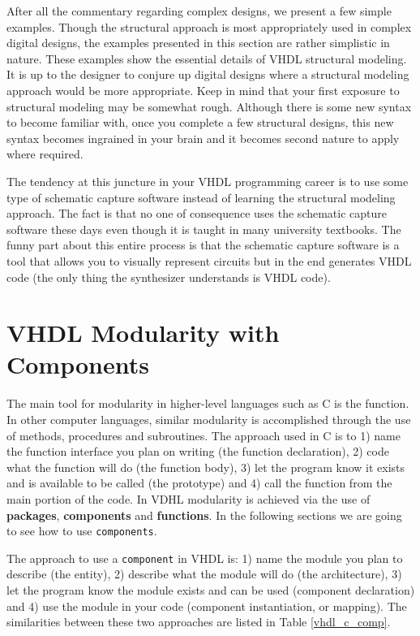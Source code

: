 After all the commentary regarding complex designs, we present a few simple examples. Though the structural approach is most appropriately used in complex digital designs, the examples presented in this section are rather simplistic in nature. These examples show the essential details of VHDL structural modeling. It is up to the designer to conjure up digital designs where a structural modeling approach would be more appropriate. Keep in mind that your first exposure to structural modeling may be somewhat rough. Although there is some new syntax to become familiar with, once you complete a few structural designs, this new syntax becomes ingrained in your brain and it becomes second nature to apply where required.

The tendency at this juncture in your VHDL programming career is to use some type of schematic capture software instead of learning the structural modeling approach. The fact is that no one of consequence uses the schematic capture software these days even though it is taught in many university textbooks. The funny part about this entire process is that the schematic capture software is a tool that allows you to visually represent circuits but in the end generates VHDL code (the only thing the synthesizer understands is VHDL code).

\section{VHDL Modularity with Components}
The main tool for modularity in higher-level languages such as C is the function. In other computer languages, similar modularity is accomplished through the use of methods, procedures and subroutines. The approach used in C is to 1) name the function interface you plan on writing (the function declaration), 2) code what the function will do (the function body), 3) let the program know it exists and is available to be called (the prototype) and 4) call the function from the main portion of the code. In VDHL modularity is achieved via the use of \textbf{packages}, \textbf{components} and \textbf{functions}. In the following sections we are going to see how to use \texttt{components}.

The approach to use a \texttt{component} in VHDL  is: 1) name the module you plan to describe (the entity), 2) describe what the module will do (the architecture), 3) let the program know the module exists and can be used (component declaration) and 4) use the module in your code (component instantiation, or mapping). The similarities between these two approaches are listed in Table \ref{vhdl_c_comp}.

